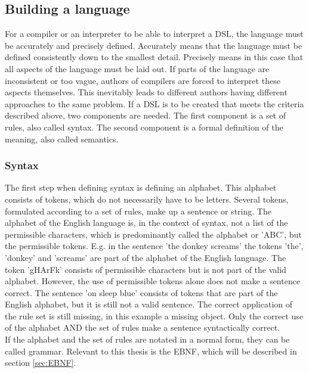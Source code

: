 \subsection{Building a language}
For a compiler or an interpreter to be able to interpret a \ac{DSL}, the language must be accurately and precisely defined. Accurately means that the language must be defined consistently down to the smallest detail. Precisely means in this case that all aspects of the language must be laid out. If parts of the language are inconsistent or too vague, authors of compilers are forced to interpret these aspects themselves. This inevitably leads to different authors having different approaches to the same problem. If a \ac{DSL} is to be created that meets the criteria described above, two components are needed. The first component is a set of rules, also called syntax. The second component is a formal definition of the meaning, also called semantics. \parencite[cf.][p. 2]{farrell_compiler_1995}
\subsubsection{Syntax}
The first step when defining syntax is defining an alphabet. This alphabet consists of tokens, which do not necessarily have to be letters. Several tokens, formulated according to a set of rules, make up a sentence or string. The alphabet of the English language is, in the context of syntax, not a list of the permissible characters, which is predominantly called the alphabet or 'ABC', but the permissible tokens.
E.g. in the sentence 'the donkey screams' the tokens 'the', 'donkey' and 'screams' are part of the alphabet of the English language. The token 'gHArFk' consists of permissible characters but is not part of the valid alphabet. However, the use of permissible tokens alone does not make a sentence correct. The sentence 'on sleep blue' consists of tokens that are part of the English alphabet, but it is still not a valid sentence. The correct application of the rule set is still missing, in this example a missing object. Only the correct use of the alphabet AND the set of rules make a sentence syntactically correct. \parencite[cf.][p. 2]{farrell_compiler_1995}\\
If the alphabet and the set of rules are notated in a normal form, they can be called grammar. Relevant to this thesis is the \ac{EBNF}, which will be described in section \ref{sec:EBNF}.
